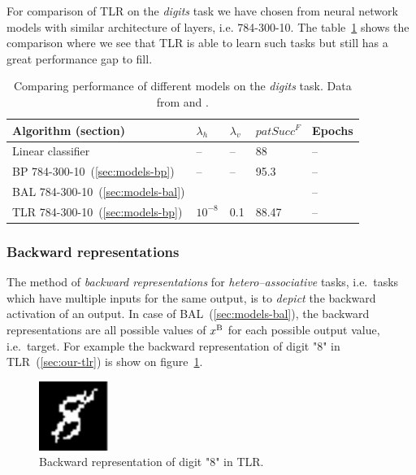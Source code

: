 For comparison of TLR on the \emph{digits} task we have chosen from \citet{digits2014mnist} neural network models with similar architecture of layers, i.e. 784-300-10. The table~\ref{tab:results-cmp-digits} shows the comparison where we see that TLR is able to learn such tasks but still has a great performance gap to fill. 

\begin{table}[H] 
  \centering
    \begin{tabular}{|l|l|l|l|l|}
    \hline
    Algorithm (section)&$\lambda_h$&$\lambda_v$&$patSucc^F$ &Epochs\\ %
    \hline
    Linear classifier & -- & -- & 88 & -- \\ 
    \hline
    BP 784-300-10~(\ref{sec:models-bp})& -- & -- & 95.3 & -- \\ 
    \hline 
    BAL 784-300-10~(\ref{sec:models-bal})& & & & -- \\
    \hline 
    TLR 784-300-10~(\ref{sec:models-bp})& $10^{-8}$ & 0.1 & 88.47 & -- \\
    \hline 
    \end{tabular}
  \caption{Comparing performance of different models on the \emph{digits} task. Data from \citet{lecun1998gradient} and \citet{digits2014mnist}.} 
  \label{tab:results-cmp-digits}
\end{table}

\subsubsection{Backward representations} 
\label{sec:our-backward-repre}

The method of \emph{backward representations} for \emph{hetero--associative} tasks, i.e.~tasks which have multiple inputs for the same output, is to \emph{depict} the backward activation of an output. In case of BAL~(\ref{sec:models-bal}), the backward representations are all possible values of $x^{\rm B}$ for each possible output value, i.e.~target. For example the backward representation of digit "8" in TLR~(\ref{sec:our-tlr}) is show on figure~\ref{fig:our-backward-repre-8}. 

\begin{figure}[H]
  \centering
  \includegraphics[width=0.2\textwidth]{img/tlr-digit-8.png} 
  \caption{Backward representation of digit "8" in TLR.}
  \label{fig:our-backward-repre-8}
\end{figure}

